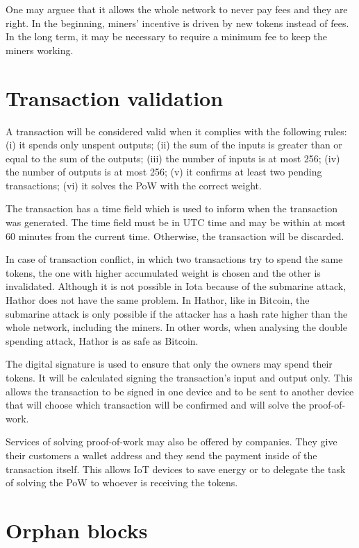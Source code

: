 One may arguee that it allows the whole network to never pay fees and they are right. In the beginning, miners' incentive is driven by new tokens instead of fees. In the long term, it may be necessary to require a minimum fee to keep the miners working.


\section{Transaction validation}

A transaction will be considered valid when it complies with the following rules: (i) it spends only unspent outputs; (ii) the sum of the inputs is greater than or equal to the sum of the outputs; (iii) the number of inputs is at most 256; (iv) the number of outputs is at most 256; (v) it confirms at least two pending transactions; (vi) it solves the PoW with the correct weight.

The transaction has a time field which is used to inform when the transaction was generated. The time field must be in UTC time and may be within at most 60 minutes from the current time. Otherwise, the transaction will be discarded.

In case of transaction conflict, in which two transactions try to spend the same tokens, the one with higher accumulated weight is chosen and the other is invalidated. Although it is not possible in Iota because of the submarine attack, Hathor does not have the same problem. In Hathor, like in Bitcoin, the submarine attack is only possible if the attacker has a hash rate higher than the whole network, including the miners. In other words, when analysing the double spending attack, Hathor is as safe as Bitcoin.

The digital signature is used to ensure that only the owners may spend their tokens. It will be calculated signing the transaction's input and output only. This allows the transaction to be signed in one device and to be sent to another device that will choose which transaction will be confirmed and will solve the proof-of-work.

Services of solving proof-of-work may also be offered by companies. They give their customers a wallet address and they send the payment inside of the transaction itself. This allows IoT devices to save energy or to delegate the task of solving the PoW to whoever is receiving the tokens.


\section{Orphan blocks}

